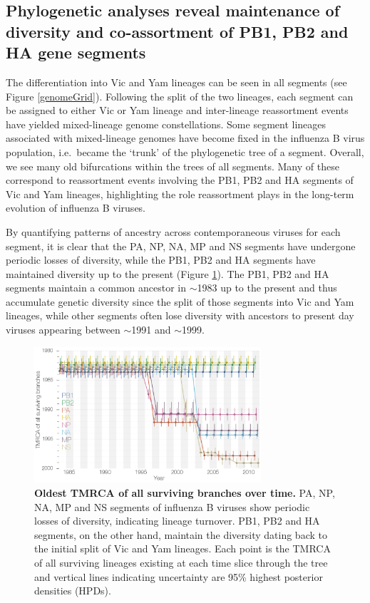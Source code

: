 \documentclass[11pt,oneside,letterpaper]{article}
\begin{document}
\subsection*{Phylogenetic analyses reveal maintenance of diversity and co-assortment of PB1, PB2 and HA gene segments}
The differentiation into Vic and Yam lineages can be seen in all segments \cite{chen2008} (see Figure \ref{genomeGrid}).
Following the split of the two lineages, each segment can be assigned to either Vic or Yam lineage and inter-lineage reassortment events have yielded mixed-lineage genome constellations.
Some segment lineages associated with mixed-lineage genomes have become fixed in the influenza B virus population, i.e.\ became the `trunk' of the phylogenetic tree of a segment.
Overall, we see many old bifurcations within the trees of all segments.
Many of these correspond to reassortment events involving the PB1, PB2 and HA segments of Vic and Yam lineages, highlighting the role reassortment plays in the long-term evolution of influenza B viruses.

By quantifying patterns of ancestry across contemporaneous viruses for each segment, it is clear that the PA, NP, NA, MP and NS segments have undergone periodic losses of diversity, while the PB1, PB2 and HA segments have maintained diversity up to the present (Figure \ref{tmrcaOT}).
The PB1, PB2 and HA segments maintain a common ancestor in $\sim$1983 up to the present and thus accumulate genetic diversity since the split of those segments into Vic and Yam lineages, while other segments often lose diversity with ancestors to present day viruses appearing between $\sim$1991 and $\sim$1999.

\begin{figure}[h]
	\centering		
	\includegraphics[width=0.75\textwidth]{figures/InfB_tmrcaOT_lines.png}
	\caption{\textbf{Oldest TMRCA of all surviving branches over time.}
PA, NP, NA, MP and NS segments of influenza B viruses show periodic losses of diversity, indicating lineage turnover.
PB1, PB2 and HA segments, on the other hand, maintain the diversity dating back to the initial split of Vic and Yam lineages.
Each point is the TMRCA of all surviving lineages existing at each time slice through the tree and vertical lines indicating uncertainty are 95\% highest posterior densities (HPDs).}
	\label{tmrcaOT}
\end{figure}
\end{document}
